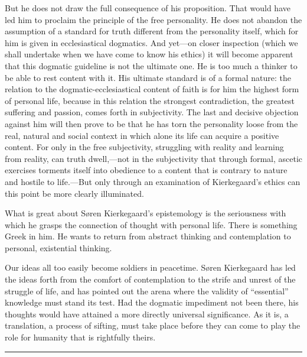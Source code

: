 \documentclass[12pt,a4paper]{book}
\newcommand{\opage}[1]{\marginnote{\footnotesize\textit{[#1]}}}
\begin{document}
But he does not draw the full consequence of his proposition. That would
have led him to proclaim the principle of the free personality. He does
not abandon the assumption of a standard for truth different from the
personality itself, which for him is given in ecclesiastical dogmatics.
And yet---on closer inspection (which we shall undertake when we have
come to know his ethics) it will become apparent that this dogmatic
guideline is not the ultimate one. He is too much a thinker to be able
to rest content with it. His ultimate standard is of a formal nature:
the relation to the dogmatic-ecclesiastical content of faith is for him
the highest form of personal life, because in this relation the strongest
contradiction, the greatest suffering and passion, comes forth in
subjectivity. The last and decisive objection against him will then prove
to be that he has torn the personality loose from the real, natural and
social context in which alone its life can acquire a positive content.
For only in the free subjectivity, struggling with reality and learning
from reality, can truth dwell,---not in the subjectivity that through
formal, ascetic exercises torments itself into obedience to a content
that is contrary to nature and hostile to life.---But only through an
examination of Kierkegaard's ethics can this point be more clearly
illuminated.

What is great about Søren Kierkegaard's epistemology is the seriousness
with which he grasps the connection of thought with personal life. There
is something Greek in him. He wants to return from abstract thinking and
contemplation to personal, existential thinking.

Our ideas all too easily become soldiers in peacetime. Søren Kierkegaard
has led the ideas forth from the comfort of
\opage{70}contemplation to the strife and unrest of the struggle of life, and has
pointed out the arena where the validity of ``essential'' knowledge must
stand its test. Had the dogmatic impediment not been there, his thoughts
would have attained a more directly universal significance. As it is, a
translation, a process of sifting, must take place before they can come
to play the role for humanity that is rightfully theirs.

\begin{center}\rule{3cm}{0.4pt}\end{center}
\end{document}
